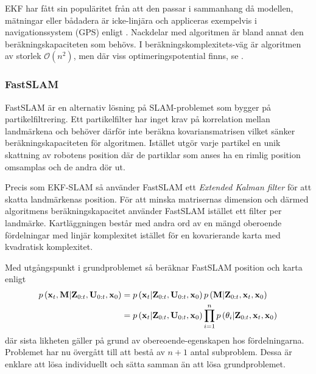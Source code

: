 \documentclass[11pt]{article}
\newcommand{\bfr}[1]{\textbf{\textrm{{#1}}}}
\begin{document}
\begin{flushleft}
EKF har fått sin populäritet från att den passar i sammanhang då modellen, mätningar eller bådadera är icke-linjära och appliceras exempelvis i navigationssystem (GPS) enligt \cite{ekfINaction}. Nackdelar med algoritmen är bland annat den beräkningskapaciteten som behövs. I beräkningskomplexitets-väg är algoritmen av storlek $\mathcal{O}\left(n^{2}\right)$, men där viss optimeringspotential finns, se \cite{ordo}.

\subsubsection{FastSLAM}
FastSLAM är en alternativ lösning på SLAM-problemet som bygger på partikelfiltrering. Ett partikelfilter har inget krav på korrelation mellan landmärkena och behöver därför inte beräkna kovariansmatrisen vilket sänker beräkningskapaciteten för algoritmen. Istället utgör varje partikel en unik skattning av robotens position där de partiklar som anses ha en rimlig position omsamplas och de andra dör ut.

Precis som EKF-SLAM så använder FastSLAM ett \emph{Extended Kalman filter} för att skatta landmärkenas position. För att minska matrisernas dimension och därmed algoritmens beräkningskapacitet använder FastSLAM istället ett filter per landmärke. Kartläggningen består med andra ord av en mängd oberoende fördelningar med linjär komplexitet istället för en kovarierande karta med kvadratisk komplexitet.

Med utgångspunkt i grundproblemet så beräknar FastSLAM position och karta enligt
\begin{align*}
	p\left(\textbf{\textrm{x}}_{t},\textbf{\textrm{M}} \vert \textbf{\textrm{Z}}_{0:t}, \textbf{\textrm{U}}_{0:t}, \textbf{\textrm{x}}_0 \right) &= p\left(\textbf{\textrm{x}}_{t}\vert \textbf{\textrm{Z}}_{0:t}, \textbf{\textrm{U}}_{0:t}, \textbf{\textrm{x}}_0 \right)p\left(\textbf{\textrm{M}} \vert \textbf{\textrm{Z}}_{0:t}, \bfr{x}_{t}, \textbf{\textrm{x}}_0 \right) \\
	&= p\left(\textbf{\textrm{x}}_{t}\vert \textbf{\textrm{Z}}_{0:t}, \textbf{\textrm{U}}_{0:t}, \textbf{\textrm{x}}_0 \right)\prod_{i=1}^{n} p\left(\theta_{i} \vert \textbf{\textrm{Z}}_{0:t}, \bfr{x}_{t}, \textbf{\textrm{x}}_0 \right)
\end{align*}
där sista likheten gäller på grund av obereoende-egenskapen hos fördelningarna. Problemet har nu övergått till att bestå av $n + 1$ antal subproblem. Dessa är enklare att lösa individuellt och sätta samman än att lösa grundproblemet.


\end{flushleft}
\end{document}
